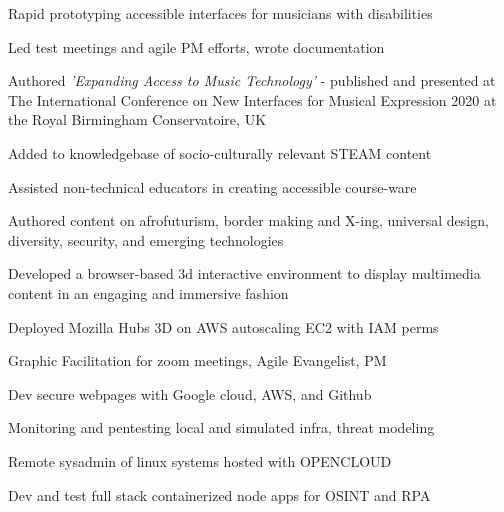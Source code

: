 \documentclass[]{quinnJarvisHollandLatex}
\begin{document}
\begin{minipage}[t]{0.60\textwidth}
\begin{tightemize}
\item Rapid prototyping accessible interfaces for musicians with disabilities
\item Led test meetings and agile PM efforts, wrote documentation
\item Authored \textit{'Expanding Access to Music Technology' } - published and presented at The International Conference on New Interfaces for Musical Expression 2020 at the Royal Birmingham Conservatoire, UK
\end{tightemize}

\begin{tightemize}
\item Added to knowledgebase of socio-culturally relevant STEAM content
\item Assisted non-technical educators in creating accessible course-ware
\item Authored content on afrofuturism, border making and X-ing, universal design, diversity, security, and emerging technologies
\item Developed a browser-based 3d interactive environment to display multimedia content in an engaging and immersive fashion
\item Deployed Mozilla Hubs 3D on AWS autoscaling EC2 with IAM perms
\end{tightemize}

\begin{tightemize}
\item Graphic Facilitation for zoom meetings, Agile Evangelist, PM
\item Dev secure webpages with Google cloud, AWS, and Github
\item Monitoring and pentesting local and simulated infra, threat modeling
\item Remote sysadmin of linux systems hosted with OPENCLOUD
\item Dev and test full stack containerized node apps for OSINT and RPA
\end{tightemize}
%
%

\end{minipage}
\end{document}

